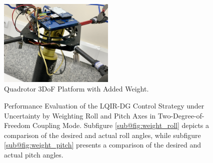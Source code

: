 \documentclass[3p,times]{elsarticle}
\begin{document}
\begin{figure}[H]
	\centering
	\includegraphics[width=0.49\textwidth]{../Figure/implementation/weight/Quad_with_weight.jpg}
	\caption{Quadrotor 3DoF Platform with Added Weight.}
	\label{fig:quadrotor_with_weight}
 \end{figure}
\begin{figure}[H]
	\centering
	\caption{Performance Evaluation of the LQIR-DG Control Strategy under Uncertainty by Weighting Roll and Pitch Axes in Two-Degree-of-Freedom Coupling Mode. Subfigure \ref{sub@fig:weight_roll} depicts a comparison of the desired and actual roll angles, while subfigure \ref{sub@fig:weight_pitch} presents a comparison of the desired and actual pitch angles.}
	\label{fig:weight}
\end{figure}
\end{document}
